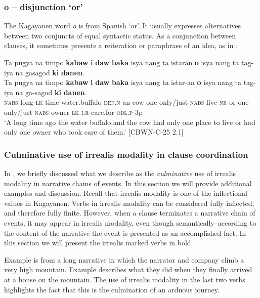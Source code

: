 \subsubsection{o – disjunction ‘or’}
\label{sec:o}
The Kagayanen word \textit{o} is from Spanish ‘or’. It usually expresses alternatives between two conjuncts of equal syntactic status. As a conjunction between clauses, it sometimes presents a reiteration or paraphrase of an idea, as in :
 
\ea
\label{ex:tookcareofthem}
Ta pugya na timpo \textbf{kabaw} \textbf{i} \textbf{daw} \textbf{baka} isya nang ta istaran \textbf{o} isya nang ta tag-iya na gasagod \textbf{ki} \textbf{danen}. \\
\vspace{4pt} \gll Ta pugya na timpo \textbf{kabaw} \textbf{i} \textbf{daw} \textbf{baka} isya nang ta istar-an \textbf{o} isya nang ta tag-iya na ga-sagod \textbf{ki} \textbf{danen}. \\
\textsc{nabs} long \textsc{lk} time water.buffalo \textsc{def.n} an cow one only/just \textsc{nabs} live-\textsc{nr} or one only/just \textsc{nabs} owner \textsc{lk} \textsc{i.r}-care.for \textsc{obl.p} 3p \\
\glt ‘A long time ago the water buffalo and the cow had only one place to live or had only one owner who took care of them.’ [CBWN-C-25 2.1]
\z

\subsubsection{Culminative use of irrealis modality in clause coordination}
\label{sec:culminativeuse}
In ,  we briefly discussed what we describe as the \textit{culminative} use of irrealis modality in narrative chains of events. In this section we will provide additional examples and discussion. Recall that irrealis modality is one of the inflectional values in Kagayanen. Verbs in irrealis modality can be considered fully inflected, and therefore fully finite. However, when a clause terminates a narrative chain of events, it may appear in irrealis modality, even though semantically--according to the content of the narrative-the event is presented as an accomplished fact. In this section we will present the irrealis marked verbs in bold.

Example  is from a long narrative in which the narrator and company climb a very high mountain. Example  describes what they did when they finally arrived at a house on the mountain. The use of irrealis modality in the last two verbs highlights the fact that this is the culmination of an arduous journey.

